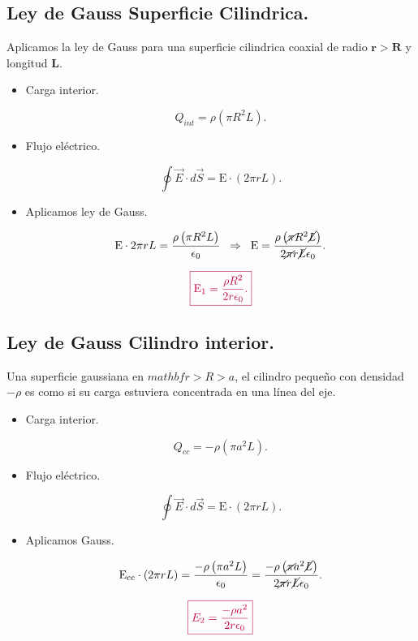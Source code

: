 \documentclass[a4paper,12pt]{article} %
\begin{document}
\subsection{Ley de Gauss Superficie Cilindrica.}

\begin{justify}
	Aplicamos la ley de Gauss para una superficie cilindrica coaxial de radio \( \mathbf{ r > R }\) y longitud \(\mathbf{L}\).
\end{justify}

\begin{itemize}
	\item Carga interior.

	      \[ Q_{int} = \rho \left( \pi R^2 L \right).\]

	\item Flujo eléctrico.

	      \[ \oint \vec{E} \cdot d \vec{S} = \mathrm{E} \cdot \left( 2 \pi r L \right). \]

	\item Aplicamos ley de Gauss.

	      \[ \mathrm{E} \cdot 2 \pi r L = \frac{\rho \left( \pi R^2 L \right)}{\epsilon_0}  \;\; \Rightarrow \;\; \mathrm{E} = \frac{\rho \left( \cancel{\pi} R^2 \cancel{L} \right)}{ 2 \cancel{\pi} r \cancel{L} \epsilon_0}.\]

	      \[\textcolor{purple}{\boxed{\mathrm{E_1} = \frac{\rho R^2}{2r\epsilon_0}.}}\]
\end{itemize}

\subsection{Ley de Gauss Cilindro interior.}

\begin{justify}
	Una superficie gaussiana en \(mathbf{r > R > a}\), el cilindro pequeño con densidad \( - \rho\) es como si su carga estuviera concentrada en una línea del eje.
\end{justify}

\begin{itemize}
	\item Carga interior.

	      \[Q_{cc} = -\rho \left(\pi a^2 L\right).  \]

	\item Flujo eléctrico.

	      \[ \oint \vec{E} \cdot d\vec{S} = \mathrm{E} \cdot \left( 2 \pi r L \right). \]

	\item Aplicamos Gauss.

	      \[ \mathrm{E_{cc}} \cdot  \left( 2 \pi r L \right) = \frac{-\rho \left(\pi a^2 L\right)}{\epsilon_0} = \frac{-\rho \left( \cancel{\pi} a^2 \cancel{L}\right)}{2 \cancel{\pi} r \cancel{L} \epsilon_0}.\]

	      \[ \textcolor{purple}{\boxed{E_{2} = \frac{-\rho a^2}{2r\epsilon_0}}}\]
\end{itemize}
\end{document}
